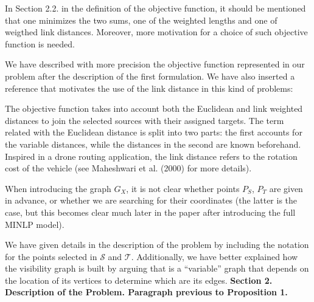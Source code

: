 \documentclass{article}
\newenvironment{reviewer}{\setcounter{pointcounter}{1}}{}
\newcommand{\point}{\text{{\selectfont \thepointcounter} \stepcounter{pointcounter}}}
\begin{document}
\begin{reviewer}
		\begin{itshape}
			In Section 2.2. in the definition of the objective function, it should be mentioned that one minimizes the two sums, one of the weighted lengths and one of weigthed link distances. Moreover, more motivation for a choice of such objective function is needed.
		\end{itshape}
		
		\begin{tcolorbox}[breakable,enhanced,coltitle=black,colback=green!5!white,colframe=green!75!black,title=\textbf{Answer R2.\point},borderline={1pt}{0pt}{black},boxrule=0pt]
			We have described with more precision the objective function represented in our problem after the description of the first formulation. We have also inserted a reference that motivates the use of the link distance in this kind of problems:
			\medskip
			
			The objective function takes into account both the Euclidean and link weighted distances to join the selected sources with their assigned targets. The term related with the Euclidean distance is split into two parts: the first accounts {\color{red} for} the variable distances, while the distances in the second are known beforehand. Inspired in a drone routing application, the link distance refers to the rotation cost of the vehicle (see Maheshwari et al. (2000) for more details).
			
		\end{tcolorbox}
	
		\begin{itshape}
			When introducing the graph $G_X$, it is not clear whether points $P_S$, $P_T$ are given in advance, or whether we are searching for their coordinates (the latter is the case, but this becomes clear much later in the paper after introducing the full MINLP model). 
		\end{itshape}
	
		\begin{tcolorbox}[breakable,enhanced,coltitle=black,colback=green!5!white,colframe=green!75!black,title=\textbf{Answer R2.\point},borderline={1pt}{0pt}{black},boxrule=0pt]
			We have given details in the description of the problem by including the notation for the points selected in $\mathcal S$ and $\mathcal T$. Additionally, we have better explained how the visibility graph is built by arguing that is a ``variable'' graph that depends on the location of its vertices to determine which are its edges. \textbf{Section 2. Description of the Problem. Paragraph previous to Proposition 1.}
		\end{tcolorbox}
		

\end{reviewer}
\end{document}
